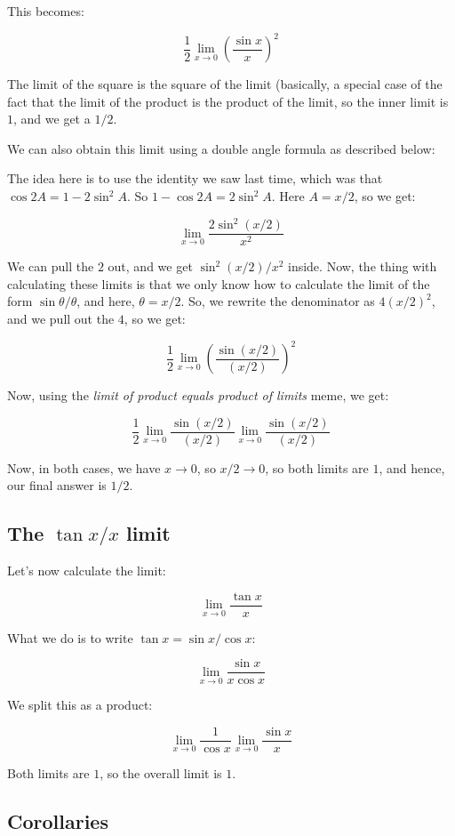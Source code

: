 \documentclass[10pt]{amsart}
\begin{document}
This becomes:

$$\frac{1}{2} \lim_{x \to 0} \left(\frac{\sin x}{x}\right)^2$$

The limit of the square is the square of the limit (basically, a
special case of the fact that the limit of the product is the product
of the limit, so the inner limit is $1$, and we get a $1/2$.

We can also obtain this limit using a double angle formula as
described below:

The idea here is to use the identity we saw last time, which was that
$\cos 2A = 1 - 2\sin^2 A$. So $1 - \cos 2A = 2\sin^2 A$. Here $A =
x/2$, so we get:

$$\lim_{x \to 0} \frac{2\sin^2(x/2)}{x^2}$$

We can pull the $2$ out, and we get $\sin^2(x/2)/x^2$ inside. Now, the
thing with calculating these limits is that we only know how to
calculate the limit of the form $\sin \theta/\theta$, and here,
$\theta = x/2$. So, we rewrite the denominator as $4(x/2)^2$, and we
pull out the $4$, so we get:

$$\frac{1}{2} \lim_{x \to 0} \left(\frac{\sin(x/2)}{(x/2)}\right)^2$$

Now, using the {\em limit of product equals product of limits} meme, we get:

$$\frac{1}{2} \lim_{x \to 0} \frac{\sin(x/2)}{(x/2)} \lim_{x \to 0} \frac{\sin(x/2)}{(x/2)}$$

Now, in both cases, we have $x \to 0$, so $x/2 \to 0$, so both limits
are $1$, and hence, our final answer is $1/2$.

\subsection*{The $\tan x/x$ limit}

Let's now calculate the limit:

$$\lim_{x \to 0} \frac{\tan x}{x} $$

What we do is to write $\tan x = \sin x/\cos x$:

$$\lim_{x \to 0} \frac{\sin x}{x \cos x}$$

We split this as a product:

$$\lim_{x \to 0} \frac{1}{\cos x} \lim_{x \to 0} \frac{\sin x}{x}$$

Both limits are $1$, so the overall limit is $1$.

\subsection{Corollaries}
\end{document}
